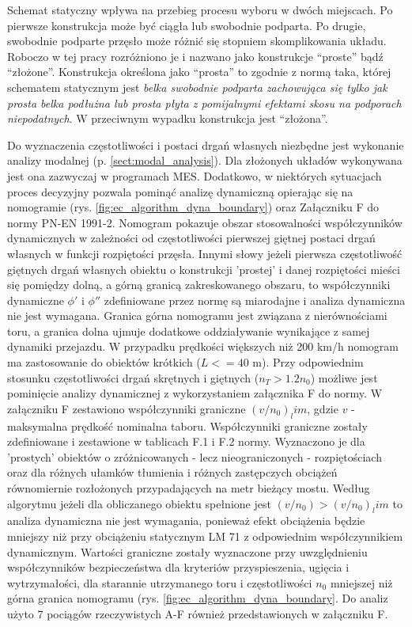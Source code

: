 Schemat statyczny wpływa na przebieg procesu wyboru w dwóch miejscach. Po pierwsze konstrukcja może być ciągła lub swobodnie podparta. Po drugie, swobodnie podparte przęsło może różnić się stopniem skomplikowania układu. Roboczo w tej pracy rozróżniono je i nazwano jako konstrukcje \enquote{proste} bądź \enquote{złożone}. Konstrukcja określona jako \enquote{prosta} to zgodnie z normą taka, której schematem statycznym jest \textit{belka swobodnie podparta zachowująca się tylko jak prosta belka podłużna lub prosta płyta z pomijalnymi efektami skosu na podporach niepodatnych}. W przeciwnym wypadku konstrukcja jest \enquote{złożona}.

Do wyznaczenia częstotliwości i postaci drgań własnych niezbędne jest wykonanie analizy modalnej (p. \ref{sect:modal_analysis}). Dla złożonych układów wykonywana jest ona zazwyczaj w programach MES. Dodatkowo, w niektórych sytuacjach proces decyzyjny pozwala pominąć analizę dynamiczną opierając się na nomogramie (rys. \ref{fig:ec_algorithm_dyna_boundary}) oraz Załączniku F do normy PN-EN 1991-2. Nomogram pokazuje obszar stosowalności współczynników dynamicznych w zależności od częstotliwości pierwszej giętnej postaci drgań własnych w funkcji rozpiętości przęsła. Innymi słowy jeżeli pierwsza częstotliwość giętnych drgań własnych obiektu o konstrukcji 'prostej' i danej rozpiętości mieści się pomiędzy dolną, a górną granicą zakreskowanego obszaru, to współczynniki dynamiczne $\phi '$ i $\phi ''$ zdefiniowane przez normę są miarodajne i analiza dynamiczna nie jest wymagana. Granica górna nomogramu jest związana z nierównościami toru, a granica dolna ujmuje dodatkowe oddziaływanie wynikające z samej dynamiki przejazdu. W przypadku prędkości większych niż 200 km/h nomogram ma zastosowanie do obiektów krótkich ($L<=40$ m). Przy odpowiednim stosunku częstotliwości drgań skrętnych i giętnych ($n_T>1.2n_0$) możliwe jest pominięcie analizy dynamicznej z wykorzystaniem załącznika F do normy. W załączniku F zestawiono współczynniki graniczne $(v/n_0)_lim$, gdzie $v$ - maksymalna prędkość nominalna taboru. Współczynniki graniczne zostały zdefiniowane i zestawione w tablicach F.1 i F.2 normy. Wyznaczono je dla 'prostych' obiektów o zróżnicowanych - lecz nieograniczonych - rozpiętościach oraz dla różnych ułamków tłumienia i różnych zastępczych obciążeń równomiernie rozłożonych przypadających na metr bieżący mostu. Według algorytmu jeżeli dla obliczanego obiektu spełnione jest $(v/n_0)>(v/n_0)_lim$ to analiza dynamiczna nie jest wymagania, ponieważ efekt obciążenia będzie mniejszy niż przy obciążeniu statycznym LM 71 z odpowiednim współczynnikiem dynamicznym. Wartości graniczne zostały wyznaczone przy uwzględnieniu współczynników bezpieczeństwa dla kryteriów przyspieszenia, ugięcia i wytrzymałości, dla starannie utrzymanego toru i częstotliwości $n_0$ mniejszej niż górna granica nomogramu (rys. \ref{fig:ec_algorithm_dyna_boundary}. Do analiz użyto 7 pociągów rzeczywistych A-F również przedstawionych w załączniku F. 
